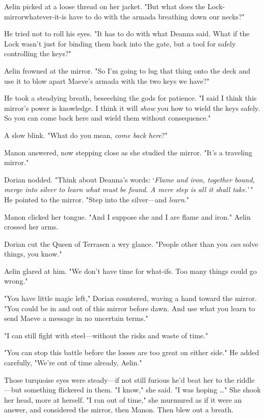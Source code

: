 Aelin picked at a loose thread on her jacket.
"But what does the Lock-mirrorwhatever-it-is have to do with the armada breathing down our necks?"

He tried not to roll his eyes.
"It has to do with what Deanna said.
What if the Lock wasn't just for binding them back into the gate, but a tool for safely controlling the keys?"

Aelin frowned at the mirror.
"So I'm going to lug that thing onto the deck and use it to blow apart Maeve's armada with the two keys we have?"

He took a steadying breath, beseeching the gods for patience.
"I said I think this mirror's power is knowledge.
I think it will \emph{show} you how to wield the keys safely.
So you can come back here and wield them without consequence."

A slow blink.
"What do you mean, \emph{come back here}?"

Manon answered, now stepping close as she studied the mirror.
"It's a traveling mirror."

Dorian nodded.
"Think about Deanna's words: `\emph{Flame and iron, together bound, merge into silver to learn what must be found}.
\emph{A mere step is all it shall take.}'\," He pointed to the mirror.
"Step into the silver---and \emph{learn}."

Manon clicked her tongue.
"And I suppose she and I are flame and iron."
Aelin crossed her arms.

Dorian cut the Queen of Terrasen a wry glance.
"People other than you \emph{can} solve things, you know."

Aelin glared at him.
"We don't have time for what-ifs.
Too many things could go wrong."

"You have little magic left," Dorian countered, waving a hand toward the mirror.
"You could be in and out of this mirror before dawn.
And use what you learn to send Maeve a message in no uncertain terms."

"I can still fight with steel---without the risks and waste of time."

"You can stop this battle before the losses are too great on either side."
He added carefully, "We're out of time already, Aelin."

Those turquoise eyes were steady---if not still furious he'd beat her to the riddle---but something flickered in them.
"I know," she said.
"I was hoping \ldots" She shook her head, more at herself.
"I ran out of time," she murmured as if it were an answer, and considered the mirror, then Manon.
Then blew out a breath.

